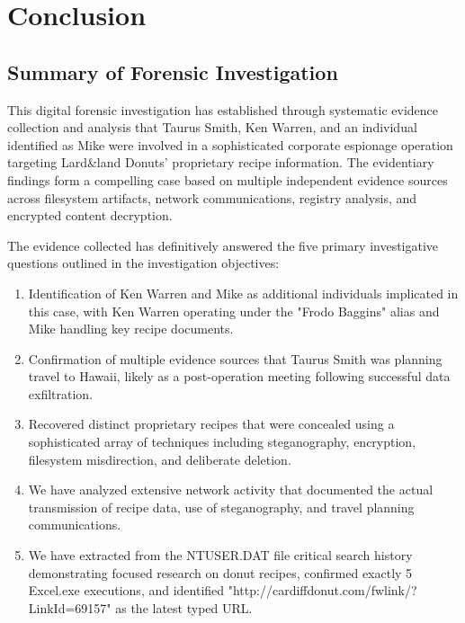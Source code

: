 \chapter{Conclusion}

\section{Summary of Forensic Investigation}
This digital forensic investigation has established through systematic evidence collection and analysis that Taurus Smith, Ken Warren, and an individual identified as Mike were involved in a sophisticated corporate espionage operation targeting Lard\&land Donuts' proprietary recipe information. The evidentiary findings form a compelling case based on multiple independent evidence sources across filesystem artifacts, network communications, registry analysis, and encrypted content decryption.

The evidence collected has definitively answered the five primary investigative questions outlined in the investigation objectives:

\begin{enumerate}
    \item Identification of Ken Warren and Mike as additional individuals implicated in this case, with Ken Warren operating under the "Frodo Baggins" alias and Mike handling key recipe documents.
    
    \item Confirmation of multiple evidence sources that Taurus Smith was planning travel to Hawaii, likely as a post-operation meeting following successful data exfiltration.
    
    \item Recovered distinct proprietary recipes that were concealed using a sophisticated array of techniques including steganography, encryption, filesystem misdirection, and deliberate deletion.
    
    \item We have analyzed extensive network activity that documented the actual transmission of recipe data, use of steganography, and travel planning communications.
    
    \item We have extracted from the NTUSER.DAT file critical search history demonstrating focused research on donut recipes, confirmed exactly 5 Excel.exe executions, and identified "http://cardiffdonut.com/fwlink/?LinkId=69157" as the latest typed URL.
\end{enumerate}

